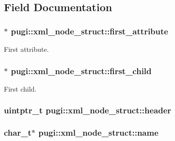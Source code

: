 \subsection{Field Documentation}
\hypertarget{structpugi_1_1xml__node__struct_a482d2daf97ce0745661cb2c57d8f6fb3}{
\subsubsection[{first\_\-attribute}]{$\ast$ {\bf pugi::xml\_\-node\_\-struct::first\_\-attribute}}}
\label{structpugi_1_1xml__node__struct_a482d2daf97ce0745661cb2c57d8f6fb3}


First attribute. \hypertarget{structpugi_1_1xml__node__struct_af72c49a0f81928ef664d9d2f0260f23d}{
\subsubsection[{first\_\-child}]{$\ast$ {\bf pugi::xml\_\-node\_\-struct::first\_\-child}}}
\label{structpugi_1_1xml__node__struct_af72c49a0f81928ef664d9d2f0260f23d}


First child. \hypertarget{structpugi_1_1xml__node__struct_aea2e405a368dc5a278a2d23465f1975c}{
\subsubsection[{header}]{\setlength{\rightskip}{0pt plus 5cm}uintptr\_\-t {\bf pugi::xml\_\-node\_\-struct::header}}}
\label{structpugi_1_1xml__node__struct_aea2e405a368dc5a278a2d23465f1975c}
\hypertarget{structpugi_1_1xml__node__struct_ae2324fdbd1e307fb12007d1d0f957a0b}{
\subsubsection[{name}]{\setlength{\rightskip}{0pt plus 5cm}char\_\-t$\ast$ {\bf pugi::xml\_\-node\_\-struct::name}}}
\label{structpugi_1_1xml__node__struct_ae2324fdbd1e307fb12007d1d0f957a0b}


